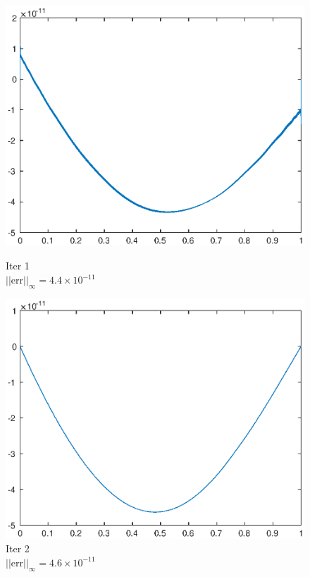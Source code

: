\documentclass[lang=cn,10pt]{elegantbook}
\begin{document}
\begin{figure}[H]
  \centering
  \begin{minipage}[t]{0.24\linewidth}
      \centering
      \includegraphics[width=0.9\linewidth]{figure/1-5-5.eps}
      \caption*{\small Iter 1 \\ $||\text{err}||_\infty=4.4\times 10^{-11}$}
  \end{minipage}
  \begin{minipage}[t]{0.24\linewidth}
    \centering
    \includegraphics[width=0.9\linewidth]{figure/1-5-6.eps}
    \caption*{\small Iter 2 \\ $||\text{err}||_\infty=4.6\times 10^{-11}$}
  \end{minipage}
\end{figure}
\end{document}
